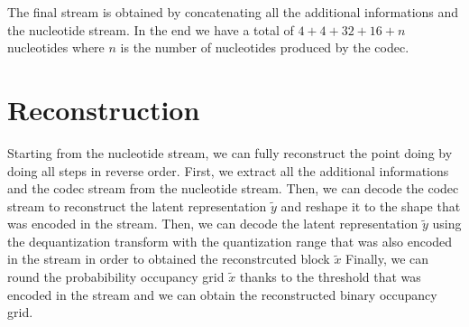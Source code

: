 The final stream is obtained by concatenating all the additional informations and the nucleotide stream. In the end we have a total of $4 + 4 + 32 + 16 + n$ nucleotides where $n$ is the number of nucleotides produced by the codec.

\section{Reconstruction}

Starting from the nucleotide stream, we can fully reconstruct the point doing by doing all steps in reverse order.
First, we extract all the additional informations and the codec stream from the nucleotide stream. Then, we can decode the codec stream to reconstruct the latent representation $\tilde{y}$ and reshape it to the shape that was encoded in the stream.
Then, we can decode the latent representation $\tilde{y}$ using the dequantization transform with the quantization range that was also encoded in the stream in order to obtained the reconstrcuted block $\tilde{x}$
Finally, we can round the probabibility occupancy grid $\tilde{x}$ thanks to the threshold that was encoded in the stream and we can obtain the reconstructed binary occupancy grid.

